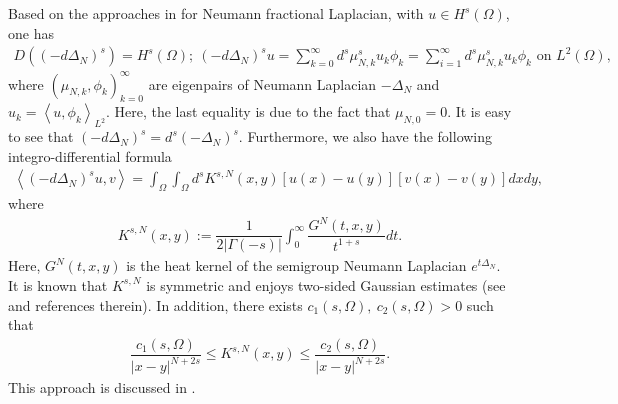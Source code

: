 \documentclass[a4paper,11pt]{amsart}
\theoremstyle{definition}
\def\N{\mathbb{N}}
\def\O{\Omega}
\numberwithin{equation}{section}
\theoremstyle{definition}
\def\O{\Omega}
\begin{document}
Based on the approaches in \cite{caffarelli_fractional_2016} for Neumann fractional Laplacian, with $u\in H^s(\O)$, one has 
\begin{align*}
D((-d\Delta_N)^{s})=H^s(\O);~
(-d\Delta_N)^{s}u=\sum_{k=0}^\infty d^s\mu_{N,k}^su_{k}\phi_k=\sum_{i=1}^\infty d^s\mu_{N,k}^su_k\phi_k \text{ on }L^2(\O),
\end{align*}
where $(\mu_{N,k},\phi_k)^\infty_{k=0}$ are eigenpairs of Neumann Laplacian $-\Delta_N$ and $u_k=\left<u,\phi_k\right>_{L^2}$. Here, the last equality is due to the fact that $\mu_{N,0}=0$. It is easy to see that $(-d\Delta_N)^{s}=d^s(-\Delta_N)^{s}$. Furthermore, we also have the following integro-differential formula
\begin{align*}
\left<(-d\Delta_N)^{s}u,v\right>=\int_{\O}\int_{\O}d^sK^{s,N}(x,y)[u(x)-u(y)][v(x)-v(y)]dxdy,
\end{align*}
where 
\begin{align*}
K^{s,N}(x,y):=\dfrac{1}{2|\Gamma(-s)|}\int_0^\infty \dfrac{G^N(t,x,y)}{t^{1+s}}dt.
\end{align*}
Here, $G^N(t,x,y)$ is the heat kernel of the semigroup Neumann Laplacian $e^{t\Delta_N}$. It is known that $K^{s,N}$ is symmetric and enjoys two-sided Gaussian estimates (see \cite[Section 2]{stinga_fractional_2015} and references therein). In addition,  there exists $c_1(s,\O),~c_2(s,\O)>0$ such that
\begin{align}\label{bounded2sides}
\dfrac{c_1(s,\O)}{|x-y|^{N+2s}}\leq K^{s,N}(x,y) \leq \dfrac{c_2(s,\O)}{|x-y|^{N+2s}}.
\end{align}
This approach is discussed in \cite[Section 7]{caffarelli_fractional_2016}. 


\end{document}
